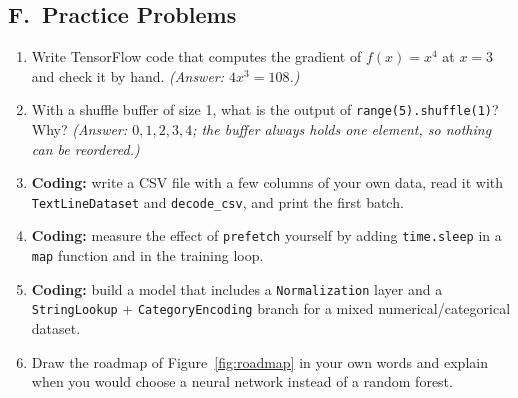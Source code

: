 \subsection*{F.\ Practice Problems}
\begin{enumerate}
  \item Write TensorFlow code that computes the gradient of $f(x)=x^4$ at $x=3$ and check it by hand. \textit{(Answer: $4x^3=108$.)}
  \item With a shuffle buffer of size 1, what is the output of \texttt{range(5).shuffle(1)}? Why? \textit{(Answer: $0,1,2,3,4$; the buffer always holds one element, so nothing can be reordered.)}
  \item \textbf{Coding:} write a CSV file with a few columns of your own data, read it with \texttt{TextLineDataset} and \texttt{decode\_csv}, and print the first batch.
  \item \textbf{Coding:} measure the effect of \texttt{prefetch} yourself by adding \texttt{time.sleep} in a \texttt{map} function and in the training loop.
  \item \textbf{Coding:} build a model that includes a \texttt{Normalization} layer and a \texttt{StringLookup} + \texttt{CategoryEncoding} branch for a mixed numerical/categorical dataset.
  \item Draw the roadmap of Figure~\ref{fig:roadmap} in your own words and explain when you would choose a neural network instead of a random forest.
\end{enumerate}


